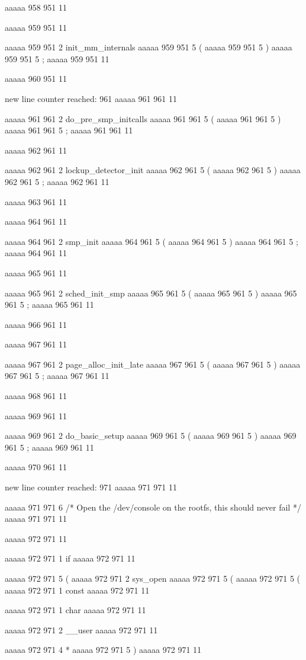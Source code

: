 {aaaaa 958 951
11


aaaaa 959 951
11
	
aaaaa 959 951
2
init_mm_internals
aaaaa 959 951
5
(
aaaaa 959 951
5
)
aaaaa 959 951
5
;
aaaaa 959 951
11


aaaaa 960 951
11


new line counter reached: 961
aaaaa 961 961
11
	
aaaaa 961 961
2
do_pre_smp_initcalls
aaaaa 961 961
5
(
aaaaa 961 961
5
)
aaaaa 961 961
5
;
aaaaa 961 961
11


aaaaa 962 961
11
	
aaaaa 962 961
2
lockup_detector_init
aaaaa 962 961
5
(
aaaaa 962 961
5
)
aaaaa 962 961
5
;
aaaaa 962 961
11


aaaaa 963 961
11


aaaaa 964 961
11
	
aaaaa 964 961
2
smp_init
aaaaa 964 961
5
(
aaaaa 964 961
5
)
aaaaa 964 961
5
;
aaaaa 964 961
11


aaaaa 965 961
11
	
aaaaa 965 961
2
sched_init_smp
aaaaa 965 961
5
(
aaaaa 965 961
5
)
aaaaa 965 961
5
;
aaaaa 965 961
11


aaaaa 966 961
11


aaaaa 967 961
11
	
aaaaa 967 961
2
page_alloc_init_late
aaaaa 967 961
5
(
aaaaa 967 961
5
)
aaaaa 967 961
5
;
aaaaa 967 961
11


aaaaa 968 961
11


aaaaa 969 961
11
	
aaaaa 969 961
2
do_basic_setup
aaaaa 969 961
5
(
aaaaa 969 961
5
)
aaaaa 969 961
5
;
aaaaa 969 961
11


aaaaa 970 961
11


new line counter reached: 971
aaaaa 971 971
11
	
aaaaa 971 971
6
/* Open the /dev/console on the rootfs, this should never fail */
aaaaa 971 971
11


aaaaa 972 971
11
	
aaaaa 972 971
1
if
aaaaa 972 971
11
 
aaaaa 972 971
5
(
aaaaa 972 971
2
sys_open
aaaaa 972 971
5
(
aaaaa 972 971
5
(
aaaaa 972 971
1
const
aaaaa 972 971
11
 
aaaaa 972 971
1
char
aaaaa 972 971
11
 
aaaaa 972 971
2
__user
aaaaa 972 971
11
 
aaaaa 972 971
4
*
aaaaa 972 971
5
)
aaaaa 972 971
11
 
}
